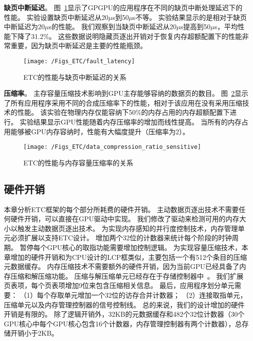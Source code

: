 \textbf{缺页中断延迟}。
图~\ref{fig:fault_latency}显示了GPGPU的应用程序在不同的缺页中断处理延迟下的性能。
实验设置缺页中断延迟从20$\mu$s到50$\mu$s不等。
实验结果显示的是相对于缺页中断延迟为20$\mu$s的性能。
我们观察到当缺页中断延迟从20$\mu$s提高到50$\mu$s，平均性能下降了31.2\%。
这些数据说明隐藏页逐出开销对于恢复内存超额配置下的性能非常重要，因为缺页中断延迟是主要的性能瓶颈。

\begin{figure}[htbp] %
  \centering
  \texttt{[image: /Figs\_ETC/fault\_latency]}
  \caption{ETC的性能与缺页中断延迟的关系}
  \label{fig:fault_latency}
\end{figure}

\textbf{压缩率}。
主存容量压缩技术影响到GPU主存能够容纳的数据页的数目。
图~\ref{fig:data_compression_ratio_sensitive}显示了所有应用程序采用不同的合成压缩率下的性能，相对于该应用在没有采用压缩技术的性能。
该实验在物理内存仅能容纳下50\%的内存占用的内存超额配置下进行。
实验结果显示GPU性能随着内存压缩率的增加而线性提高。
当所有的内存占用能够被GPU内存容纳时，性能有大幅度提升（压缩率为2）。

\begin{figure}[htbp] %
  \centering
  \texttt{[image: /Figs\_ETC/data\_compression\_ratio\_sensitive]}
  \caption{ETC的性能与内存容量压缩率的关系}
  \label{fig:data_compression_ratio_sensitive}
\end{figure}

\subsection{硬件开销}
本章分析ETC框架的每个部分所耗费的硬件开销。
主动数据页逐出技术不需要任何硬件开销，可以直接在GPU驱动中实现。
我们修改了驱动来检测可用的内存大小以触发主动数据页逐出技术。
为实现内存感知的并行度控制技术，内存管理单元必须扩展以支持ETC设计。
增加两个32位的计数器来统计每个阶段的时钟周期。
暂停每个GPU核心的取指功能需要增加控制逻辑。
为实现容量压缩技术，本章增加的硬件开销和为CPU设计的LCP框类似，主要包括一个有512个条目的压缩元数据缓存。
内存压缩技术不需要额外的硬件开销，因为当前GPU已经具备了内存压缩和解压缩功能。
压缩与解压缩单元已经存在于存储控制器中~。
我们扩展页表项，每个页表项增加9位来包含压缩相关信息。
最后，应用程序划分单元需要：
（1）每个存取单元增加一个32位的访存合并计数器；
（2）连接取指单元，压缩单元以及内存管理控制器的信号控制线。
总的来说，我们的设计增加的硬件开销是有限的。
除了逻辑开销外，32KB的元数据缓存和482个32位计数器（30个GPU核心中每个GPU核心包含16个计数器，内存管理控制器有两个计数器），总存储开销小于2KB。

